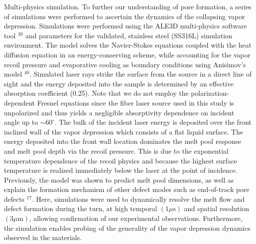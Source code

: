\documentclass[10pt]{article}
\begin{document}
Multi-physics simulation. To further our understanding of pore formation, a series of simulations were performed to ascertain the dynamics of the collapsing vapor depression. Simulations were performed using the ALE3D multi-physics software tool ${ }^{39}$ and parameters for the validated, stainless steel (SS316L) simulation environment. The model solves the Navier-Stokes equations coupled with the heat diffusion equation in an energy-conserving scheme, while accounting for the vapor recoil pressure and evaporative cooling as boundary conditions using Anisimov's model $^{40}$. Simulated laser rays strike the surface from the source in a direct line of sight and the energy deposited into the sample is determined by an effective absorption coefficient (0.25). Note that we do not employ the polarization-dependent Fresnel equations since the fiber laser source used in this study is unpolarized and thus yields a negligible absorptivity dependence on incident angle up to $\sim 60^{\circ}$. The bulk of the incident laser energy is deposited over the front inclined wall of the vapor depression which consists of a flat liquid surface. The energy deposited into the front wall location dominates the melt pool response and melt pool depth via the recoil pressure. This is due to the exponential temperature dependence of the recoil physics and because the highest surface temperature is realized immediately below the laser at the point of incidence. Previously, the model was shown to predict melt pool dimensions, as well as explain the formation mechanism of other defect modes such as end-of-track pore defects ${ }^{17}$. Here, simulations were used to dynamically resolve the melt flow and defect formation during the turn, at high temporal $(1 \mu \mathrm{s})$ and spatial resolution $(3 \mu \mathrm{m})$, allowing confirmation of our experimental observations. Furthermore, the simulation enables probing of the generality of the vapor depression dynamics observed in the materials.
\end{document}
